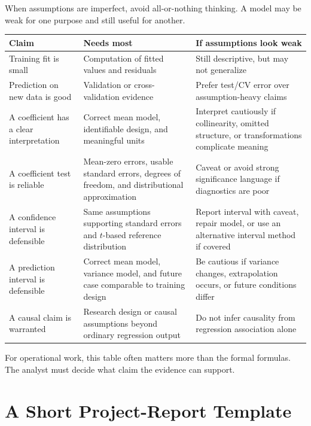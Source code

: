 When assumptions are imperfect, avoid all-or-nothing thinking.  A model may be weak for one purpose and still useful for another.

\begin{center}
\begin{tabular}{>{\raggedright\arraybackslash}p{}>{\raggedright\arraybackslash}p{}>{\raggedright\arraybackslash}p{}}
\toprule
\textbf{Claim} & \textbf{Needs most} & \textbf{If assumptions look weak} \\
\midrule
Training fit is small & Computation of fitted values and residuals & Still descriptive, but may not generalize \\
Prediction on new data is good & Validation or cross-validation evidence & Prefer test/CV error over assumption-heavy claims \\
A coefficient has a clear interpretation & Correct mean model, identifiable design, and meaningful units & Interpret cautiously if collinearity, omitted structure, or transformations complicate meaning \\
A coefficient test is reliable & Mean-zero errors, usable standard errors, degrees of freedom, and distributional approximation & Caveat or avoid strong significance language if diagnostics are poor \\
A confidence interval is defensible & Same assumptions supporting standard errors and \(t\)-based reference distribution & Report interval with caveat, repair model, or use an alternative interval method if covered \\
A prediction interval is defensible & Correct mean model, variance model, and future case comparable to training design & Be cautious if variance changes, extrapolation occurs, or future conditions differ \\
A causal claim is warranted & Research design or causal assumptions beyond ordinary regression output & Do not infer causality from regression association alone \\
\bottomrule
\end{tabular}
\end{center}

For operational work, this table often matters more than the formal formulas.  The analyst must decide what claim the evidence can support.

\section{A Short Project-Report Template}


